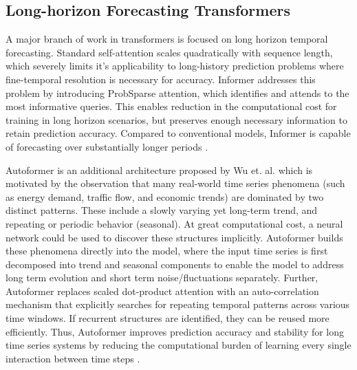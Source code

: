 \subsection{Long-horizon Forecasting Transformers}

A major branch of work in transformers is focused on long horizon temporal forecasting. Standard self-attention scales quadratically with sequence length, which severely limits it's applicability to long-history prediction problems where fine-temporal resolution is necessary for accuracy. Informer addresses this problem by introducing ProbSparse attention, which identifies and attends to the most informative queries. This enables reduction in the computational cost for training in long horizon scenarios, but preserves enough necessary information to retain prediction accuracy. Compared to conventional models, Informer is capable of forecasting over substantially longer periods \cite{zhou2020informer}. 

Autoformer is an additional architecture proposed by Wu et. al. which is motivated by the observation that many real-world time series phenomena (such as energy demand, traffic flow, and economic trends) are dominated by two distinct patterns. These include a slowly varying yet long-term trend, and repeating or periodic behavior (seasonal). At great computational cost, a neural network could be used to discover these structures implicitly. Autoformer builds these phenomena directly into the model, where the input time series is first decomposed into trend and seasonal components to enable the model to address long term evolution and short term noise/fluctuations separately. Further, Autoformer replaces scaled dot-product attention with an auto-correlation mechanism that explicitly searches for repeating temporal patterns across various time windows. If recurrent structures are identified, they can be reused more efficiently. Thus, Autoformer improves prediction accuracy and stability for long time series systems by reducing the computational burden of learning every single interaction between time steps \cite{wu2021autoformer}.

